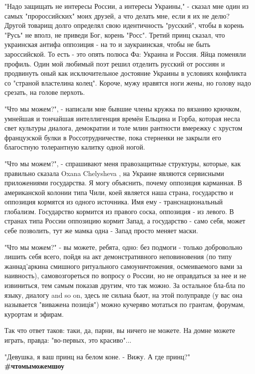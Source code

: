 "Надо защищать не интересы России, а интересы Украины," - сказал мне один из
самых "пророссийских" моих друзей, а что делать мне, если я их не делю? Другой
товарищ долго определял свою идентичность "русский", чтобы в корень "Русь" не
вполз, не приведи Бог, корень "Росс". Третий принц сказал, что украинская
антифа оппозиция - на то и заукраинская, чтобы не быть зароссийской. То есть -
это опять полюса Фа: Украина и Россия. Яйца поменяли профиль. Один мой любимый
поэт решил отделить русский от россиян и продвинуть оный как исключительное
достояние Украины в условиях конфликта со "страной властелина колец". Короче,
мужу нравятся ноги жены, но голову надо срезать, на голове перхоть.

"Что мы можем?", - написали мне бывшие члены кружка по вязанию крючком,
умнейшая и тончайшая интеллигенция времён Ельцина и Горба, которая несла свет
культуры диалога, демократии и толе млин рантности вмережку с хрустом
французской булки в Россотрудничестве, пока стерненки не закрыли его благостную
толерантную калитку одной ногой.

"Что мы можем?", - спрашивают меня правозащитные структуры, которые, как
правильно сказала Oxana Chelysheva , на Украине являются сервисными
приложениями государства. Я могу объяснить, почему оппозиция карманная. В
американской колонии типа Чили, коей является наша страна, государство и
оппозиция кормятся из одного источника. Имя ему - транснациональный глобализм.
Государство кормится из правого соска, оппозиция - из левого. В странах типа
России оппозицию кормит Запад, а государство   - само себя, может себе
позволить, тут же мамка одна - Запад просто меняет маски.

"Что мы можем?" - вы можете, ребята, одно: без подмоги - только добровольно
лишить себя всего, пойдя на акт демонстративного неповиновения (по типу
жаннад'аркина смишного ритуального самоуничтожения, осмеиваемого вами за
наивность), самовозгореться по вопросу о России, но не оправдаться за нее и не
извиниться, тем самым показав другим, что так можно. За остальное бла-бла по
языку, диалогу and so on, здесь не сильна бьют, на этой полуправде (у вас она
называется "виважена позиція") можно кучеряво мотаться по грантам,  форумам,
курортам и эфирам. 

Так что ответ таков: таки, да, парни, вы ничего не можете. На домне можете
играть, правда: "во-первых, это красиво"...

"Девушка, я ваш принц на белом коне. - Вижу. А где принц?" \textbf{\#чтомыможемшоу}
